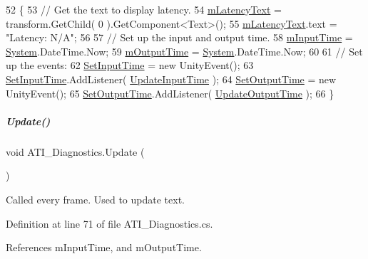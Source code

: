 \begin{DoxyCode}
52     \{
53         \textcolor{comment}{// Get the text to display latency.}
54         \hyperlink{group___audio_testing_a8929a6a2ae14ec733b936a72cb0f44a6}{mLatencyText} = transform.GetChild( 0 ).GetComponent<Text>();
55         \hyperlink{group___audio_testing_a8929a6a2ae14ec733b936a72cb0f44a6}{mLatencyText}.text = \textcolor{stringliteral}{"Latency: N/A"};
56 
57         \textcolor{comment}{// Set up the input and output time.}
58         \hyperlink{group___audio_testing_a683f09700eab208b7368ebcb82bbd3be}{mInputTime} = \hyperlink{namespace_system}{System}.DateTime.Now;
59         \hyperlink{group___audio_testing_a2e6f675a990948db789381f52071e1bf}{mOutputTime} = \hyperlink{namespace_system}{System}.DateTime.Now;
60 
61         \textcolor{comment}{// Set up the events:}
62         \hyperlink{group___audio_testing_a133561901c2aef535b2f3c098e55b959}{SetInputTime} = \textcolor{keyword}{new} UnityEvent();
63         \hyperlink{group___audio_testing_a133561901c2aef535b2f3c098e55b959}{SetInputTime}.AddListener( \hyperlink{group___audio_testing_afcdfad4dc61b1f22a6efcef738897515}{UpdateInputTime} );
64         \hyperlink{group___audio_testing_a6360e6098323b921b4a1b306914d06ef}{SetOutputTime} = \textcolor{keyword}{new} UnityEvent();
65         \hyperlink{group___audio_testing_a6360e6098323b921b4a1b306914d06ef}{SetOutputTime}.AddListener( \hyperlink{group___audio_testing_ac172cf129d078d8b0e979bc17d11c5a0}{UpdateOutputTime} );
66     \}
\end{DoxyCode}
\mbox{\label{group___audio_testing_a4d131588b33317383ff7430b2917658e}} 
\subparagraph{\texorpdfstring{Update()}{Update()}}
{\footnotesize\ttfamily void A\+T\+I\+\_\+\+Diagnostics.\+Update (\begin{DoxyParamCaption}{ }\end{DoxyParamCaption})\hspace{0.3cm}{\ttfamily [private]}}



Called every frame. Used to update text. 



Definition at line 71 of file A\+T\+I\+\_\+\+Diagnostics.\+cs.



References m\+Input\+Time, and m\+Output\+Time.


